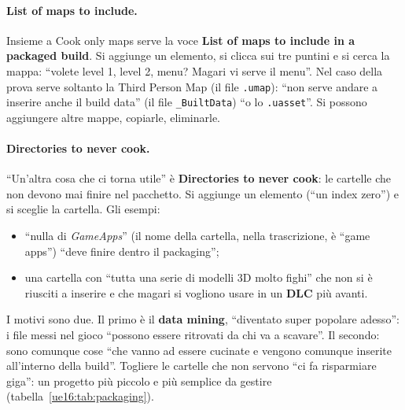 \paragraph{List of maps to include.} Insieme a Cook only maps serve la voce \textbf{List of maps
to include in a packaged build}. Si aggiunge un elemento, si clicca sui tre puntini e si cerca
la mappa: ``volete level 1, level 2, menu? Magari vi serve il menu''. Nel caso della prova
serve soltanto la Third Person Map (il file \texttt{.umap}): ``non serve andare a inserire anche
il build data'' (il file \texttt{\_BuiltData}) ``o lo \texttt{.uasset}''. Si possono aggiungere
altre mappe, copiarle, eliminarle.

\paragraph{Directories to never cook.} ``Un'altra cosa che ci torna utile'' è
\textbf{Directories to never cook}: le cartelle che non devono mai finire nel pacchetto. Si
aggiunge un elemento (``un index zero'') e si sceglie la cartella. Gli esempi:
\begin{itemize}
  \item ``nulla di \emph{GameApps}'' (il nome della cartella, nella trascrizione, è ``game
        apps'') ``deve finire dentro il packaging'';
  \item una cartella con ``tutta una serie di modelli 3D molto fighi'' che non si è riusciti a
        inserire e che magari si vogliono usare in un \textbf{DLC} più avanti.
\end{itemize}
I motivi sono due. Il primo è il \textbf{data mining}, ``diventato super popolare adesso'': i
file messi nel gioco ``possono essere ritrovati da chi va a scavare''. Il secondo: sono comunque
cose ``che vanno ad essere cucinate e vengono comunque inserite all'interno della build''.
Togliere le cartelle che non servono ``ci fa risparmiare giga'': un progetto più piccolo e più
semplice da gestire (tabella~\ref{ue16:tab:packaging}).

